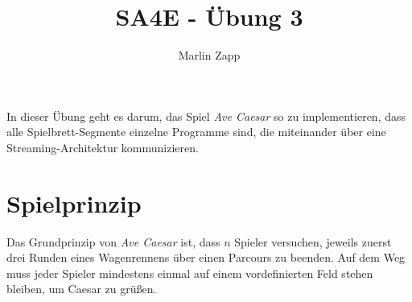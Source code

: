 \documentclass[]{article}
\title{SA4E - Übung 3}
\author{Marlin Zapp}
\begin{document}
\maketitle

In dieser Übung geht es darum, das Spiel \emph{Ave Caesar} so zu implementieren, dass alle Spielbrett-Segmente einzelne Programme sind, die miteinander über eine Streaming-Architektur kommunizieren.

\tableofcontents

\section{Spielprinzip}
\label{sec:spielprinzip}

Das Grundprinzip von \emph{Ave Caesar} ist, dass $n$ Spieler versuchen, jeweils zuerst drei Runden eines Wagenrennens über einen Parcours zu beenden. Auf dem Weg muss jeder Spieler mindestens einmal auf einem vordefinierten Feld stehen bleiben, um Caesar zu grüßen.
\end{document}
